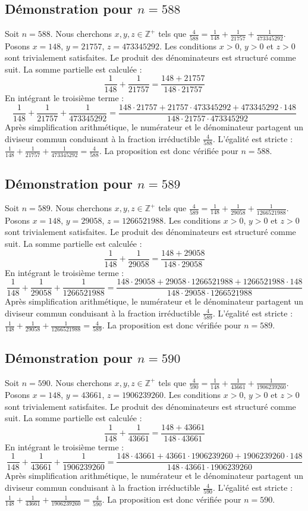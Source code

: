 \documentclass[11pt,a4paper]{article}
\begin{document}
\subsection{Démonstration pour $n = 588$}
Soit $n = 588$. Nous cherchons $x, y, z \in \mathbb{Z}^{+}$ tels que $\frac{4}{588} = \frac{1}{148} + \frac{1}{21757} + \frac{1}{473345292}$.
Posons $x = 148$, $y = 21757$, $z = 473345292$.
Les conditions $x > 0$, $y > 0$ et $z > 0$ sont trivialement satisfaites.
Le produit des dénominateurs est structuré comme suit. La somme partielle est calculée :
$$ \frac{1}{148} + \frac{1}{21757} = \frac{148+21757}{148 \cdot 21757} $$
En intégrant le troisième terme :
$$ \frac{1}{148} + \frac{1}{21757} + \frac{1}{473345292} = \frac{148 \cdot 21757 + 21757 \cdot 473345292 + 473345292 \cdot 148}{148 \cdot 21757 \cdot 473345292} $$
Après simplification arithmétique, le numérateur et le dénominateur partagent un diviseur commun conduisant à la fraction irréductible $\frac{4}{588}$.
L'égalité est stricte : $\frac{1}{148} + \frac{1}{21757} + \frac{1}{473345292} = \frac{4}{588}$.
La proposition est donc vérifiée pour $n = 588$.
\subsection{Démonstration pour $n = 589$}
Soit $n = 589$. Nous cherchons $x, y, z \in \mathbb{Z}^{+}$ tels que $\frac{4}{589} = \frac{1}{148} + \frac{1}{29058} + \frac{1}{1266521988}$.
Posons $x = 148$, $y = 29058$, $z = 1266521988$.
Les conditions $x > 0$, $y > 0$ et $z > 0$ sont trivialement satisfaites.
Le produit des dénominateurs est structuré comme suit. La somme partielle est calculée :
$$ \frac{1}{148} + \frac{1}{29058} = \frac{148+29058}{148 \cdot 29058} $$
En intégrant le troisième terme :
$$ \frac{1}{148} + \frac{1}{29058} + \frac{1}{1266521988} = \frac{148 \cdot 29058 + 29058 \cdot 1266521988 + 1266521988 \cdot 148}{148 \cdot 29058 \cdot 1266521988} $$
Après simplification arithmétique, le numérateur et le dénominateur partagent un diviseur commun conduisant à la fraction irréductible $\frac{4}{589}$.
L'égalité est stricte : $\frac{1}{148} + \frac{1}{29058} + \frac{1}{1266521988} = \frac{4}{589}$.
La proposition est donc vérifiée pour $n = 589$.
\subsection{Démonstration pour $n = 590$}
Soit $n = 590$. Nous cherchons $x, y, z \in \mathbb{Z}^{+}$ tels que $\frac{4}{590} = \frac{1}{148} + \frac{1}{43661} + \frac{1}{1906239260}$.
Posons $x = 148$, $y = 43661$, $z = 1906239260$.
Les conditions $x > 0$, $y > 0$ et $z > 0$ sont trivialement satisfaites.
Le produit des dénominateurs est structuré comme suit. La somme partielle est calculée :
$$ \frac{1}{148} + \frac{1}{43661} = \frac{148+43661}{148 \cdot 43661} $$
En intégrant le troisième terme :
$$ \frac{1}{148} + \frac{1}{43661} + \frac{1}{1906239260} = \frac{148 \cdot 43661 + 43661 \cdot 1906239260 + 1906239260 \cdot 148}{148 \cdot 43661 \cdot 1906239260} $$
Après simplification arithmétique, le numérateur et le dénominateur partagent un diviseur commun conduisant à la fraction irréductible $\frac{4}{590}$.
L'égalité est stricte : $\frac{1}{148} + \frac{1}{43661} + \frac{1}{1906239260} = \frac{4}{590}$.
La proposition est donc vérifiée pour $n = 590$.
\end{document}
